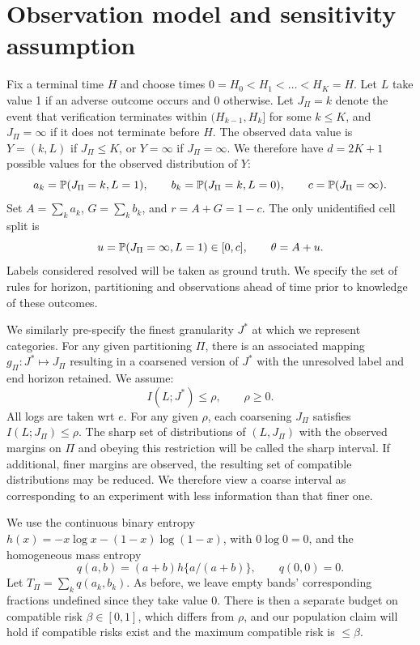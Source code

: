 \section{Observation model and sensitivity assumption}\label{sec:model}
Fix a terminal time $H$ and choose times $0=H_0<H_1<\ldots<H_K=H$. Let $L$ take value 1 if an adverse outcome occurs and 0 otherwise. Let $J_\Pi=k$ denote the event that verification terminates within $(H_{k-1},H_k]$ for some $k\le K$, and $J_\Pi=\infty$ if it does not terminate before $H$. The observed data value is $Y=(k,L)$ if $J_\Pi\le K$, or $Y=\infty$ if $J_\Pi=\infty$. We therefore have $d=2K+1$ possible values for the observed distribution of $Y$:
\begin{equation}\label{eq:masses}
 a_k=\mathbb P(J_\Pi=k,L=1),\qquad b_k=\mathbb P(J_\Pi=k,L=0),\qquad c=\mathbb P(J_\Pi=\infty).
\end{equation}
Set $A=\sum_k a_k$, $G=\sum_k b_k$, and $r=A+G=1-c$. The only unidentified cell split is
\begin{equation}\label{eq:hidden}
 u=\mathbb P(J_\Pi=\infty,L=1)\in[0,c],\qquad \theta=A+u.
\end{equation}
Labels considered resolved will be taken as ground truth. We specify the set of rules for horizon, partitioning and observations ahead of time prior to knowledge of these outcomes.

We similarly pre-specify the finest granularity $J^*$ at which we represent categories. For any given partitioning $\Pi$, there is an associated mapping $g_\Pi: J^* \mapsto J_\Pi$ resulting in a coarsened version of $J^*$ with the unresolved label and end horizon retained. We assume: 
\begin{equation}\label{eq:pis}
 I(L;J^*)\le\rho,\qquad \rho\ge0.
\end{equation}
All logs are taken wrt $e$. For any given $\rho$, each coarsening $J_\Pi$ satisfies $I(L;J_\Pi) \leq \rho$. The sharp set of distributions of $(L, J_\Pi)$ with the observed margins on $\Pi$ and obeying this restriction will be called the sharp interval. If additional, finer margins are observed, the resulting set of compatible distributions may be reduced. We therefore view a coarse interval as corresponding to an experiment with less information than that finer one.

We use the continuous binary entropy $h(x)=-x\log x-(1-x)\log(1-x)$, with $0\log0=0$, and the homogeneous mass entropy
\begin{equation}\label{eq:massentropy}
 q(a,b)=(a+b)h\{a/(a+b)\},\qquad q(0,0)=0.
\end{equation}
Let $T_\Pi=\sum_k q(a_k,b_k)$. As before, we leave empty bands' corresponding fractions undefined since they take value 0. There is then a separate budget on compatible risk $\beta \in [0,1]$, which differs from $\rho$, and our population claim will hold if compatible risks exist and the maximum compatible risk is $\le \beta$.

